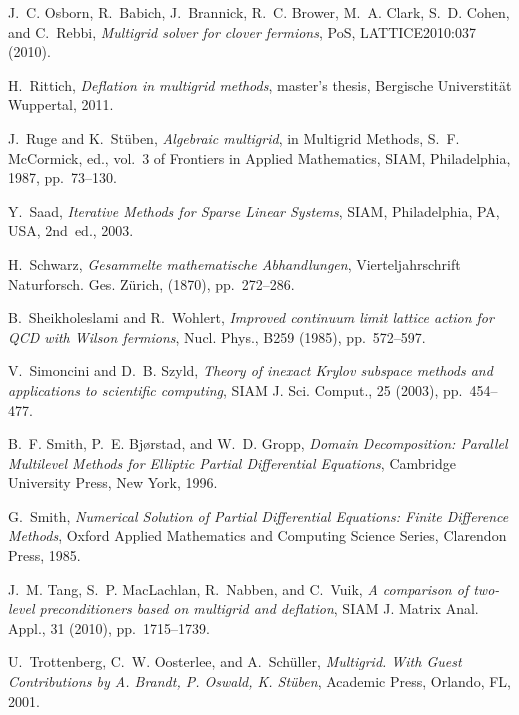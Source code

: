 \documentclass{siamltex}
\begin{document}
\begin{thebibliography}{10}
  {\sc J.~C. Osborn, R.~Babich, J.~Brannick, R.~C. Brower, M.~A. Clark, S.~D.
    Cohen, and C.~Rebbi}, {\em Multigrid solver for clover fermions}, PoS,
  LATTICE2010:037 (2010).

  {\sc H.~Rittich}, {\em Deflation in multigrid methods}, master's thesis,
  Bergische Universtit{\"{a}}t Wuppertal, 2011.

  {\sc J.~Ruge and K.~St{\"{u}}ben}, {\em Algebraic multigrid}, in Multigrid
  Methods, S.~F. McCormick, ed., vol.~3 of Frontiers in Applied Mathematics,
  SIAM, Philadelphia, 1987, pp.~73--130.

  {\sc Y.~Saad}, {\em Iterative Methods for Sparse Linear Systems}, SIAM,
  Philadelphia, PA, USA, 2nd~ed., 2003.

  {\sc H.~Schwarz}, {\em Gesammelte mathematische {A}bhandlungen},
  Vierteljahrschrift Naturforsch. Ges. Z{\"{u}}rich,  (1870), pp.~272--286.

  {\sc B.~Sheikholeslami and R.~Wohlert}, {\em Improved continuum limit lattice
      action for {QCD} with {W}ilson fermions}, Nucl. Phys., B259 (1985),
  pp.~572--597.

  {\sc V.~Simoncini and D.~B. Szyld}, {\em Theory of inexact {K}rylov subspace
      methods and applications to scientific computing}, SIAM J. Sci. Comput., 25
  (2003), pp.~454--477.

  {\sc B.~F. Smith, P.~E. Bj{\o}rstad, and W.~D. Gropp}, {\em Domain
      Decomposition: Parallel Multilevel Methods for Elliptic Partial Differential
      Equations}, Cambridge University Press, New York, 1996.

  {\sc G.~Smith}, {\em Numerical Solution of Partial Differential Equations:
      Finite Difference Methods}, Oxford Applied Mathematics and Computing Science
  Series, Clarendon Press, 1985.

  {\sc J.~M. Tang, S.~P. MacLachlan, R.~Nabben, and C.~Vuik}, {\em A comparison
      of two-level preconditioners based on multigrid and deflation}, SIAM J.
  Matrix Anal. Appl., 31 (2010), pp.~1715--1739.

  {\sc U.~Trottenberg, C.~W. Oosterlee, and A.~Sch{\"{u}}ller}, {\em Multigrid.
  With Guest Contributions by A. Brandt, P. Oswald, K. St{\"{u}}ben}, Academic
  Press, Orlando, FL, 2001.


\end{thebibliography}
\end{document}
